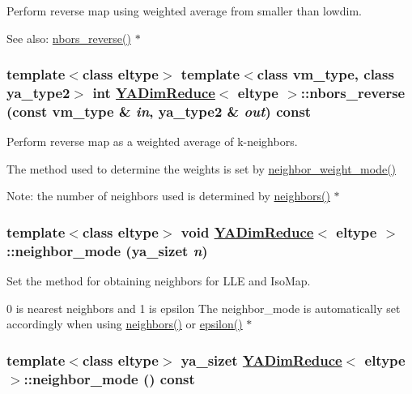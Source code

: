 Perform reverse map using weighted average from smaller than lowdim. 

\begin{Desc}
\item[See also:]\hyperlink{class_y_a_dim_reduce_a33}{nbors\_\-reverse()} $\ast$ \end{Desc}
\hypertarget{class_y_a_dim_reduce_a33}{
\subsubsection[nbors\_\-reverse]{\setlength{\rightskip}{0pt plus 5cm}template$<$class eltype$>$ template$<$class vm\_\-type, class ya\_\-type2$>$ int \hyperlink{class_y_a_dim_reduce}{YADim\-Reduce}$<$ eltype $>$::nbors\_\-reverse (const vm\_\-type \& {\em in}, ya\_\-type2 \& {\em out}) const}}
\label{class_y_a_dim_reduce_a33}


Perform reverse map as a weighted average of k-neighbors. 

The method used to determine the weights is set by \hyperlink{class_y_a_dim_reduce_a27}{neighbor\_\-weight\_\-mode()} \begin{Desc}
\item[Note:]the number of neighbors used is determined by \hyperlink{class_y_a_dim_reduce_a21}{neighbors()} $\ast$ \end{Desc}
\hypertarget{class_y_a_dim_reduce_a26}{
\subsubsection[neighbor\_\-mode]{\setlength{\rightskip}{0pt plus 5cm}template$<$class eltype$>$ void \hyperlink{class_y_a_dim_reduce}{YADim\-Reduce}$<$ eltype $>$::neighbor\_\-mode (ya\_\-sizet {\em n})}}
\label{class_y_a_dim_reduce_a26}


Set the method for obtaining neighbors for LLE and Iso\-Map. 

0 is nearest neighbors and 1 is epsilon The neighbor\_\-mode is automatically set accordingly when using \hyperlink{class_y_a_dim_reduce_a21}{neighbors()} or \hyperlink{class_y_a_dim_reduce_a23}{epsilon()} $\ast$ \hypertarget{class_y_a_dim_reduce_a25}{
\subsubsection[neighbor\_\-mode]{\setlength{\rightskip}{0pt plus 5cm}template$<$class eltype$>$ ya\_\-sizet \hyperlink{class_y_a_dim_reduce}{YADim\-Reduce}$<$ eltype $>$::neighbor\_\-mode () const}}
\label{class_y_a_dim_reduce_a25}


